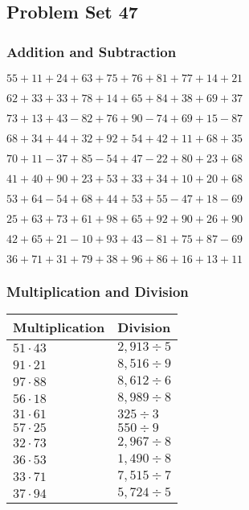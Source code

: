 \hypertarget{problem-set-47}{%
\subsection{Problem Set 47}\label{problem-set-47}}

\hypertarget{addition-and-subtraction}{%
\subsubsection{Addition and
Subtraction}\label{addition-and-subtraction}}

\(55+11+24+63+75+76+81+77+14+21\)

\(62+33+33+78+14+65+84+38+69+37\)

\(73+13+43-82+76+90-74+69+15-87\)

\(68+34+44+32+92+54+42+11+68+35\)

\(70+11-37+85-54+47-22+80+23+68\)

\(41+40+90+23+53+33+34+10+20+68\)

\(53+64-54+68+44+53+55-47+18-69\)

\(25+63+73+61+98+65+92+90+26+90\)

\(42+65+21-10+93+43-81+75+87-69\)

\(36+71+31+79+38+96+86+16+13+11\)

\hypertarget{multiplication-and-division}{%
\subsubsection{Multiplication and
Division}\label{multiplication-and-division}}

\begin{longtable}[]{@{}ll@{}}
\toprule
Multiplication & Division\tabularnewline
\midrule
\endhead
\(51\cdot43\) & \(2,913÷5\)\tabularnewline
\(91\cdot21\) & \(8,516÷9\)\tabularnewline
\(97\cdot88\) & \(8,612÷6\)\tabularnewline
\(56\cdot18\) & \(8,989÷8\)\tabularnewline
\(31\cdot61\) & \(325÷3\)\tabularnewline
\(57\cdot25\) & \(550÷9\)\tabularnewline
\(32\cdot73\) & \(2,967÷8\)\tabularnewline
\(36\cdot53\) & \(1,490÷8\)\tabularnewline
\(33\cdot71\) & \(7,515÷7\)\tabularnewline
\(37\cdot94\) & \(5,724÷5\)\tabularnewline
\bottomrule
\end{longtable}
